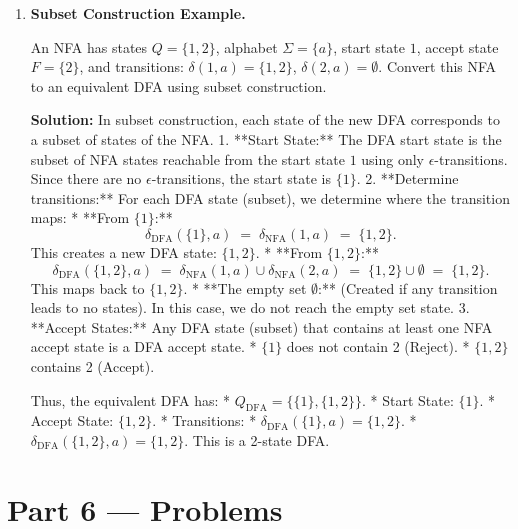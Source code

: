 \documentclass[12pt, a4paper]{book}
\begin{document}
\begin{problembox}
\begin{enumerate}[label=\textbf{E\arabic*.}]
  \item \textbf{Subset Construction Example.}
  
        An NFA has states $Q = \{1, 2\}$, alphabet $\Sigma = \{a\}$, start state $1$, accept state $F = \{2\}$, and transitions:
        $\delta(1, a) = \{1, 2\}$, $\delta(2, a) = \emptyset$.
        Convert this NFA to an equivalent DFA using subset construction.
        
        \textbf{Solution:}
        In subset construction, each state of the new DFA corresponds to a subset of states of the NFA.
        1. **Start State:** The DFA start state is the subset of NFA states reachable from the start state $1$ using only $\epsilon$-transitions. Since there are no $\epsilon$-transitions, the start state is $\{1\}$.
        2. **Determine transitions:**
           For each DFA state (subset), we determine where the transition maps:
           * **From $\{1\}$:**
             \[
               \delta_{\text{DFA}}(\{1\}, a) \;=\; \delta_{\text{NFA}}(1, a) \;=\; \{1, 2\}.
             \]
             This creates a new DFA state: $\{1, 2\}$.
           * **From $\{1, 2\}$:**
             \[
               \delta_{\text{DFA}}(\{1, 2\}, a) \;=\; \delta_{\text{NFA}}(1, a) \cup \delta_{\text{NFA}}(2, a) \;=\; \{1, 2\} \cup \emptyset \;=\; \{1, 2\}.
             \]
             This maps back to $\{1, 2\}$.
           * **The empty set $\emptyset$:** (Created if any transition leads to no states). In this case, we do not reach the empty set state.
        3. **Accept States:** Any DFA state (subset) that contains at least one NFA accept state is a DFA accept state.
           * $\{1\}$ does not contain 2 (Reject).
           * $\{1, 2\}$ contains 2 (Accept).
           
        Thus, the equivalent DFA has:
        * $Q_{\text{DFA}} = \{\{1\}, \{1, 2\}\}$.
        * Start State: $\{1\}$.
        * Accept State: $\{1, 2\}$.
        * Transitions:
          * $\delta_{\text{DFA}}(\{1\}, a) = \{1, 2\}$.
          * $\delta_{\text{DFA}}(\{1, 2\}, a) = \{1, 2\}$.
        This is a 2-state DFA.
\end{enumerate}
\end{problembox}

\newpage

\section{Part 6 --- Problems}
\end{document}
